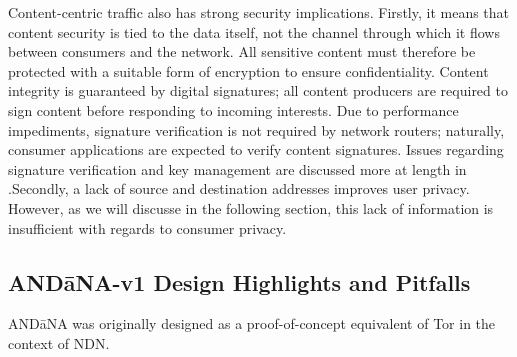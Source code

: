 Content-centric traffic also has strong security implications. Firstly, it means that content security is tied to the data itself, not the channel through which it flows between consumers and the network. All sensitive content must therefore be protected with a suitable form of encryption to ensure confidentiality. Content integrity is guaranteed by digital signatures; all content producers are required to sign content before responding to incoming interests. Due to performance impediments, signature verification is not required by network routers; naturally, consumer applications are expected to verify content signatures. Issues regarding signature verification and key management are discussed more at length in \cite{}.Secondly, a lack of source and destination addresses improves user privacy. However, as we will discusse in the following section, this lack of information is insufficient with regards to consumer privacy. 

\subsection{AND\=aNA-v1 Design Highlights and Pitfalls}
AND\=aNA was originally designed as a proof-of-concept equivalent of Tor \cite{Tor} in the context of NDN. 
